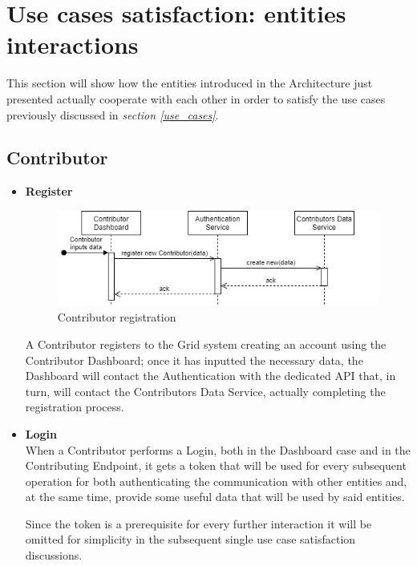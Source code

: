 \section{Use cases satisfaction: entities interactions}\label{use_cases_satisfaction}
This section will show how the entities introduced in the Architecture just presented actually cooperate with each other in order to satisfy the use cases previously discussed in \textit{section \ref{use_cases}}. 

\subsection{Contributor}
\begin{itemize}
    \item \textbf{Register}\\
    \begin{figure}[!ht]
        \centering
        \includegraphics[scale=1]{document/chapters/chapter_6/images/use_cases_satisfaction_contributor_register.jpg}
        \caption{Contributor registration}
        \label{fig:use_cases_satisfaction_contributor_register}
    \end{figure}

    A Contributor registers to the Grid system creating an account using the Contributor Dashboard; once it has inputted the necessary data, the Dashboard will contact the Authentication with the dedicated API that, in turn, will contact the Contributors Data Service, actually completing the registration process.

    \item \textbf{Login}\\
    When a Contributor performs a Login, both in the Dashboard case and in the Contributing Endpoint, it gets a token that will be used for every subsequent operation for both authenticating the communication with other entities and, at the same time, provide some useful data that will be used by said entities.
    
    Since the token is a prerequisite for every further interaction it will be omitted for simplicity in the subsequent single use case satisfaction discussions. 
     

\end{itemize}
